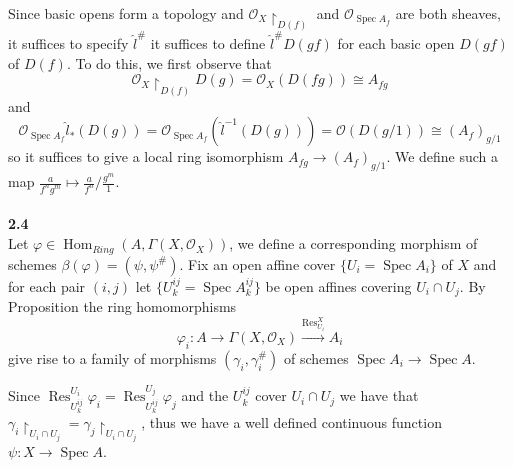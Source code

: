 \documentclass[12pt]{article}
\numberwithin{thm}{subsection}
\numberwithin{defn}{subsection}
\numberwithin{lemma}{subsection}
\numberwithin{example}{subsection}
\numberwithin{notation}{subsection}
\numberwithin{cor}{subsection}
\numberwithin{remark}{subsection}
\numberwithin{condition}{subsection}
\numberwithin{question}{subsection}
\numberwithin{construction}{subsection}
\numberwithin{construction}{subsection}
\numberwithin{construction}{subsection}
\newcommand{\call}[1]{\mathcal{#1}}
\newcommand{\lto}{\longrightarrow}
\newcommand{\spec}{\operatorname{Spec}}
\begin{document}
Since basic opens form a topology and $\call{O}_X\restriction_{D(f)}$ and $\call{O}_{\spec A_f}$ are both sheaves, it suffices to specify $\hat{l}^{\#}$ it suffices to define $\hat{l}^{\#}D(gf)$ for each basic open $D(gf)$ of $D(f)$. To do this, we first observe that \[\call{O}_X\restriction_{D(f)}D(g) = \call{O}_X(D(fg)) \cong A_{fg}\]
and
\[\call{O}_{\spec A_f}\hat{l}_\ast(D(g)) = \call{O}_{\spec A_f}(\hat{l}^{-1}(D(g))) = \call{O}(D(g/1)) \cong (A_f)_{g/1}\]
so it suffices to give a local ring isomorphism $A_{fg} \to (A_f)_{g/1}$. We define such a map $\frac{a}{f^ng^m} \mapsto \frac{a}{f^n}/\frac{g^m}{1}$.\\\\
%
%
%
\textbf{2.4}\\
Let $\varphi \in \operatorname{Hom}_{Ring}(A, \Gamma(X,\call{O}_X))$, we define a corresponding morphism of schemes $\beta(\varphi) = (\psi, \psi^{\#})$. Fix an open affine cover $\lbrace U_i = \operatorname{Spec}A_i\rbrace$ of $X$ and for each pair $(i,j)$ let $\lbrace U^{ij}_k = \operatorname{Spec}A^{ij}_k\rbrace$ be open affines covering $U_i \cap U_j$. By Proposition \cite[2.3]{hartshorne} the ring homomorphisms \[\varphi_i: A \lto \Gamma(X, \call{O}_X) \stackrel{\operatorname{Res}^X_{U_i}}{\lto} A_i\] give rise to a family of morphisms $(\gamma_i,\gamma^{\#}_i)$ of schemes $\operatorname{Spec}A_i \to \operatorname{Spec}A$.

Since $\operatorname{Res}^{U_i}_{U^{ij}_k}\varphi_i = \operatorname{Res}^{U_j}_{U^{ij}_k}\varphi_j$ and the $U_k^{ij}$ cover $U_i \cap U_j$ we have that $\gamma_i\restriction_{U_i \cap U_j} = \gamma_j\restriction_{U_i \cap U_j}$, thus we have a well defined continuous function $\psi: X \to \operatorname{Spec}A$.
\end{document}

